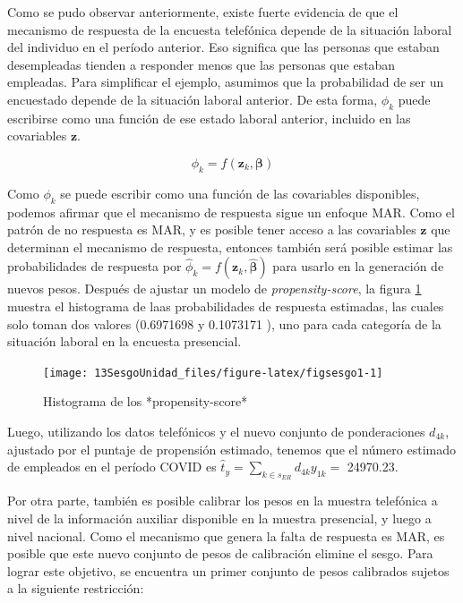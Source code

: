 \documentclass[
  12pt,
]{book}
\begin{document}
Como se pudo observar anteriormente, existe fuerte evidencia de que el mecanismo de respuesta de la encuesta telefónica depende de la situación laboral del individuo en el período anterior. Eso significa que las personas que estaban desempleadas tienden a responder menos que las personas que estaban empleadas. Para simplificar el ejemplo, asumimos que la probabilidad de ser un encuestado depende de la situación laboral anterior. De esta forma, \(\phi_k\) puede escribirse como una función de ese estado laboral anterior, incluido en las covariables \(\mathbf{z}\).

\[
{\phi}_k = f(\mathbf{z}_k, {\boldsymbol{\beta}})   
\]

Como \(\phi_k\) se puede escribir como una función de las covariables disponibles, podemos afirmar que el mecanismo de respuesta sigue un enfoque MAR. Como el patrón de no respuesta es MAR, y es posible tener acceso a las covariables \(\mathbf{z}\) que determinan el mecanismo de respuesta, entonces también será posible estimar las probabilidades de respuesta por \(\hat{\phi}_k = f(\mathbf{z }_k, \hat{\boldsymbol{\beta}})\) para usarlo en la generación de nuevos pesos. Después de ajustar un modelo de \emph{propensity-score}, la figura \ref{fig:figsesgo1} muestra el histograma de laas probabilidades de respuesta estimadas, las cuales solo toman dos valores (0.6971698 y 0.1073171 ), uno para cada categoría de la situación laboral en la encuesta presencial.

\begin{figure}

{\centering \texttt{[image: 13SesgoUnidad\_files/figure-latex/figsesgo1-1]} 

}

\caption{Histograma de los *propensity-score*}\label{fig:figsesgo1}
\end{figure}

Luego, utilizando los datos telefónicos y el nuevo conjunto de ponderaciones \(d_{4k}\), ajustado por el puntaje de propensión estimado, tenemos que el número estimado de empleados en el período COVID es \(\hat{t}_y=\sum_{k\in s_{ER}}d_{4k}y_{1k} =\) 24970.23.

Por otra parte, también es posible calibrar los pesos en la muestra telefónica a nivel de la información auxiliar disponible en la muestra presencial, y luego a nivel nacional. Como el mecanismo que genera la falta de respuesta es MAR, es posible que este nuevo conjunto de pesos de calibración elimine el sesgo. Para lograr este objetivo, se encuentra un primer conjunto de pesos calibrados sujetos a la siguiente restricción:
\end{document}
